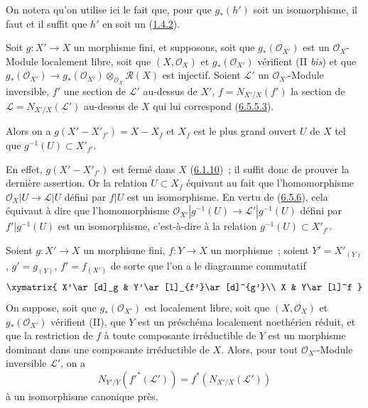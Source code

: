 On notera qu'on utilise ici le fait que, pour que $g_*(h')$ soit un
isomorphisme, il faut et il suffit que $h'$ en soit un
(\hyperref[II.1.4.2-fr]{1.4.2}).

\begin{corollary}[6.5.7]
\label{II.6.5.7-fr}
Soit $g:X'\to X$ un morphisme fini, et supposons, soit que
$g_*(\mathcal{O}_{X'})$ est un $\mathcal{O}_X$-Module localement libre, soit
que $(X,\mathcal{O}_X)$ et $g_*(\mathcal{O}_{X'})$ vérifient (II \emph{bis})
et que
$g_*(\mathcal{O}_{X'})\to
g_*(\mathcal{O}_{X'})\otimes_{\mathcal{O}_X}\mathcal{R}(X)$ est injectif.
Soient $\mathcal{L}'$ un $\mathcal{O}_{X'}$-Module inversible, $f'$ une
section de $\mathcal{L}'$ au-dessus de $X'$, $f=N_{X'/X}(f')$ la section de
$\mathcal{L}=N_{X'/X}(\mathcal{L}')$ au-dessus de $X$ qui lui correspond
(\hyperref[II.6.5.5.3-fr]{6.5.5.3}).


Alors on a $g(X'-X'_{f'})=X-X_f$ et $X_f$ est le plus grand ouvert $U$ de
$X$ tel que $g^{-1}(U)\subset X'_{f'}$.
\end{corollary}

En effet, $g(X'-X'_{f'})$ est fermé dans $X$
(\hyperref[II.6.1.10-fr]{6.1.10})~; il suffit donc de prouver la dernière
assertion. Or la relation $U\subset X_f$ équivaut au fait que l'homomorphisme
$\mathcal{O}_X|U\to\mathcal{L}|U$ défini par $f|U$ est un isomorphisme. En
vertu de (\hyperref[II.6.5.6-fr]{6.5.6}), cela équivaut à dire que
l'homomorphisme
$\mathcal{O}_{X'}|g^{-1}(U)\to\mathcal{L}'|g^{-1}(U)$ défini par
$f'|g^{-1}(U)$ est un isomorphisme, c'est-à-dire à la relation
$g^{-1}(U)\subset X'_{f'}$.

\begin{proposition}[6.5.8]
\label{II.6.5.8-fr}
Soient $g:X'\to X$ un morphisme fini, $f:Y\to X$ un morphisme~; soient
$Y'=X'_{(Y)}$, $g'=g_{(Y)}$, $f'=f_{(X')}$ de sorte que l'on a le diagramme
commutatif
\[
\xymatrix{
X'\ar[d]_g & Y'\ar[l]_{f'}\ar[d]^{g'}\\
X & Y\ar[l]^f
}
\]
On suppose, soit que $g_*(\mathcal{O}_{X'})$ est localement libre, soit que
$(X,\mathcal{O}_X)$ et $g_*(\mathcal{O}_{X'})$ vérifient (II), que $Y$ est un
préschéma localement noethérien réduit, et que la restriction de $f$ à toute
composante irréductible de $Y$ est un morphisme dominant dans une composante
irréductible de $X$. Alors, pour tout $\mathcal{O}_{X'}$-Module inversible
$\mathcal{L}'$, on a
\[
N_{Y'/Y}({f'}^*(\mathcal{L}'))=f^*(N_{X'/X}(\mathcal{L}'))
\]
à un isomorphisme canonique près.
\end{proposition}

